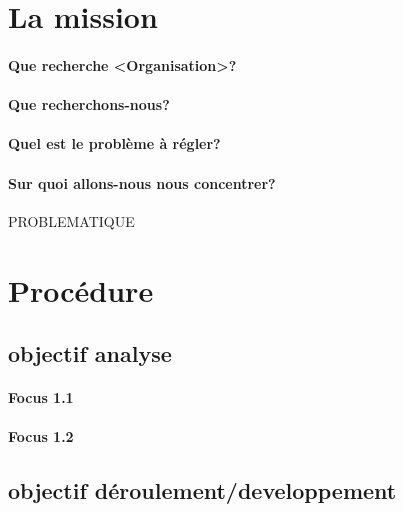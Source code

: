 \documentclass[
	headsepline=on,
	footsepline=on,
	twoside=off,
	abstract=on,
	DIV=10
]{scrreprt}
\begin{document}
		\section{La mission}
			\paragraph{Que recherche <Organisation>?}
		
			\paragraph{Que recherchons-nous?}
			
			\paragraph{Quel est le problème à régler?}
			
			\paragraph{Sur quoi allons-nous nous concentrer?}
			
			\begin{problem}
				\sffamily
				PROBLEMATIQUE
			\end{problem}

		\section{Procédure}
			\subsection{objectif analyse}
				\paragraph{Focus 1.1}
				
				\paragraph{Focus 1.2}
			
			\subsection{objectif déroulement/developpement}
\end{document}
